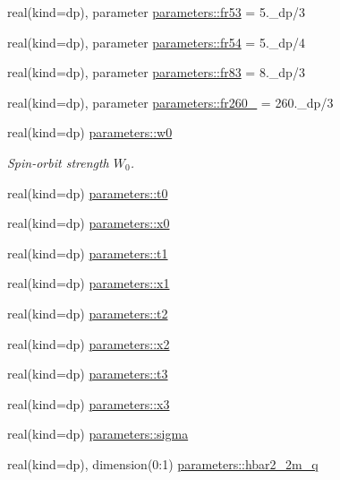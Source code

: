 \begin{DoxyCompactItemize}
\item 
real(kind=dp), parameter \mbox{\hyperlink{group__FRACTIONS_ga348f3739fc94f9786aeb6045a5c9c76b}{parameters\+::fr53}} = 5.\+\_\+dp/3
\item 
real(kind=dp), parameter \mbox{\hyperlink{group__FRACTIONS_ga4b5dee914c69f248bc576e0ef5a48cad}{parameters\+::fr54}} = 5.\+\_\+dp/4
\item 
real(kind=dp), parameter \mbox{\hyperlink{group__FRACTIONS_ga74e22f362165a8830c6acb135f54921a}{parameters\+::fr83}} = 8.\+\_\+dp/3
\item 
real(kind=dp), parameter \mbox{\hyperlink{group__FRACTIONS_ga5a9e77cd58019aeeb71cd5be86faf68f}{parameters\+::fr260\+\_}} = 260.\+\_\+dp/3
\item 
real(kind=dp) \mbox{\hyperlink{group__SKYRME__PARS_gabbfefb4415d1278f79fd07d05105335a}{parameters\+::w0}}
\begin{DoxyCompactList}\small\item\em Spin-\/orbit strength $W_0$. \end{DoxyCompactList}\item 
real(kind=dp) \mbox{\hyperlink{group__SKYRME__PARS_gadbebfa135603ae9f34b4a98ac62ce8d8}{parameters\+::t0}}
\item 
real(kind=dp) \mbox{\hyperlink{group__SKYRME__PARS_ga86c5690b49e0b02be9cae32459f6cc37}{parameters\+::x0}}
\item 
real(kind=dp) \mbox{\hyperlink{group__SKYRME__PARS_ga2104f8e3f4c55a866272683975f6acd0}{parameters\+::t1}}
\item 
real(kind=dp) \mbox{\hyperlink{group__SKYRME__PARS_ga17d86815551fd59fbeaba6cc8e54438b}{parameters\+::x1}}
\item 
real(kind=dp) \mbox{\hyperlink{group__SKYRME__PARS_ga28e545481d284c866487bfb61e918159}{parameters\+::t2}}
\item 
real(kind=dp) \mbox{\hyperlink{group__SKYRME__PARS_ga505cd8d8fea1c311291e29cfb0516c91}{parameters\+::x2}}
\item 
real(kind=dp) \mbox{\hyperlink{group__SKYRME__PARS_ga41ad159facccbc41a3a4bf58942da03d}{parameters\+::t3}}
\item 
real(kind=dp) \mbox{\hyperlink{group__SKYRME__PARS_ga361bcdef664c7f70557bcc2f42b2abce}{parameters\+::x3}}
\item 
real(kind=dp) \mbox{\hyperlink{group__SKYRME__PARS_ga3726a27918a1e2929cdac9ffd451ec14}{parameters\+::sigma}}
\item 
real(kind=dp), dimension(0\+:1) \mbox{\hyperlink{group__SKYRME__PARS_ga8eaaa7306780e89ea9299163596ebc7f}{parameters\+::hbar2\+\_\+2m\+\_\+q}}

\end{DoxyCompactItemize}

